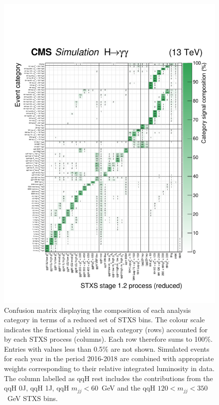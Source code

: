 \begin{figure}[hptb]
  \centering
  \includegraphics[width=1\textwidth]{Figures/hgg_overview/purityMatrix_UL_final.pdf}
  \caption[Confusion matrix for the full set of analysis categories]
  {
    Confusion matrix displaying the composition of each analysis category in terms of a reduced set of STXS bins. The colour scale indicates the fractional yield in each category (rows) accounted for by each STXS process (columns). Each row therefore sums to 100\%. Entries with values less than 0.5\% are not shown. Simulated events for each year in the period 2016-2018 are combined with appropriate weights corresponding to their relative integrated luminosity in data. The column labelled as qqH rest includes the contributions from the qqH 0J, qqH 1J, qqH $m_{jj}<60$~GeV and the qqH $120<m_{jj}<350$~GeV STXS bins.
  }
  \label{fig:categorisation_validation}
\end{figure}




